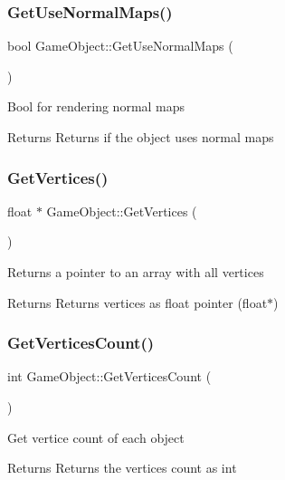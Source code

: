 \subsubsection{\texorpdfstring{GetUseNormalMaps()}{GetUseNormalMaps()}}
{\footnotesize\ttfamily bool Game\+Object\+::\+Get\+Use\+Normal\+Maps (\begin{DoxyParamCaption}{ }\end{DoxyParamCaption})}

Bool for rendering normal maps \begin{DoxyReturn}{Returns}
Returns if the object uses normal maps 
\end{DoxyReturn}
\mbox{\label{class_game_object_acd61e0ec39b7130ce29f8b4d89983f26}} 
\subsubsection{\texorpdfstring{GetVertices()}{GetVertices()}}
{\footnotesize\ttfamily float $\ast$ Game\+Object\+::\+Get\+Vertices (\begin{DoxyParamCaption}{ }\end{DoxyParamCaption})}

Returns a pointer to an array with all vertices \begin{DoxyReturn}{Returns}
Returns vertices as float pointer (float$\ast$) 
\end{DoxyReturn}
\mbox{\label{class_game_object_a3c0c54e2ea7c46be00e6ba56fd23a605}} 
\subsubsection{\texorpdfstring{GetVerticesCount()}{GetVerticesCount()}}
{\footnotesize\ttfamily int Game\+Object\+::\+Get\+Vertices\+Count (\begin{DoxyParamCaption}{ }\end{DoxyParamCaption})}

Get vertice count of each object \begin{DoxyReturn}{Returns}
Returns the vertices count as int 
\end{DoxyReturn}
\mbox{\label{class_game_object_a69b8f6ffe839e09eb0a0fea12659847d}} 
